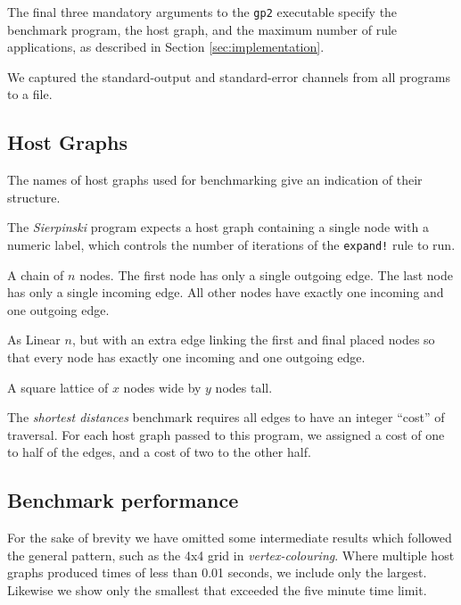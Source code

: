 The final three mandatory arguments to the \texttt{gp2} executable specify the benchmark program, the host graph, and the maximum number of rule applications, as described in Section \ref{sec:implementation}.

We captured the standard-output and standard-error channels from all programs to a file.

\subsection{Host Graphs}
\label{subsec:hosts}

The names of host graphs used for benchmarking give an indication of their structure.

\begin{description}
	\setlength\itemsep{-0.2em}
	\item[Gen $n$] The \textit{Sierpinski} program expects a host graph containing a single node with a numeric label, which controls the number of iterations of the \texttt{expand!} rule to run.

	\item[Linear $n$] A chain of $n$ nodes. The first node has only a single outgoing edge. The last node has only a single incoming edge. All other nodes have exactly one incoming and one outgoing edge.

	\item[Cyclic $n$] As Linear $n$, but with an extra edge linking the first and final placed nodes so that every node has exactly one incoming and one outgoing edge.

	\item[$x \times y$ Grid] A square lattice of $x$ nodes wide by $y$ nodes tall.
\end{description}

The \textit{shortest distances} benchmark requires all edges to have an integer ``cost'' of traversal. For each host graph passed to this program, we assigned a cost of one to half of the edges, and a cost of two to the other half.



\subsection{Benchmark performance}\label{sec:benchperf}

For the sake of brevity we have omitted some intermediate results which followed the general pattern, such as the 4x4 grid in \textit{vertex-colouring}. Where multiple host graphs produced times of less than 0.01 seconds, we include only the largest. Likewise we show only the smallest that exceeded the five minute time limit.



